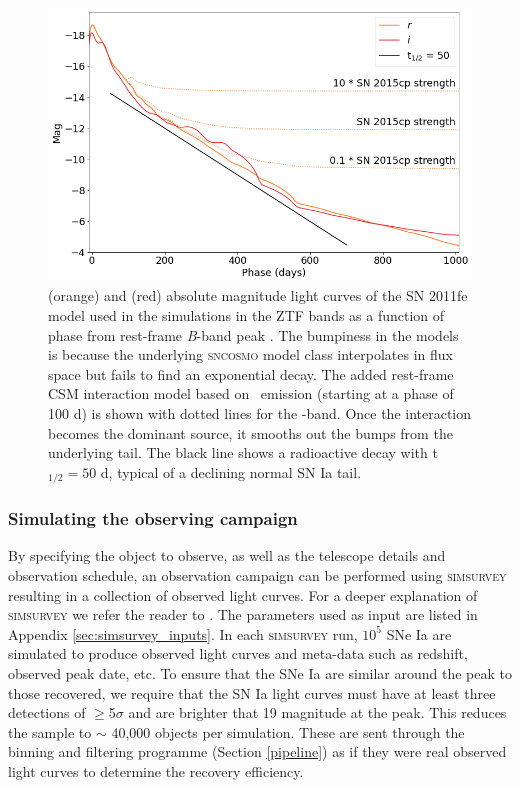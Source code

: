 \documentclass[a4paper,oneside,12pt, class=Latex/Classes/PhDthesisPSnPDF, crop=false]{standalone}
\begin{document}
\begin{figure}
 \centering
 \includegraphics[width=\textwidth]{../Images/chapter_3/11fe_mods.png}
 \caption{\ztfr (orange) and \ztfi (red) absolute magnitude light curves of the SN 2011fe model used in the simulations in the ZTF bands as a function of phase from rest-frame \textit{B}-band peak \citep{spec_HST}. The bumpiness in the models is because the underlying \textsc{sncosmo} model class interpolates in flux space but fails to find an exponential decay. The added rest-frame CSM interaction model based on \Halpha~emission (starting at a phase of 100 d) is shown with dotted lines for the \ztfr-band. Once the interaction becomes the dominant source, it smooths out the bumps from the underlying tail. The black line shows a radioactive decay with t$_{1/2}=50$ d, typical of a declining normal SN Ia tail.}
 \label{11fe_mods}
\end{figure}

\subsubsection{Simulating the observing campaign}
\label{sim_obs}
By specifying the object to observe, as well as the telescope details and observation schedule, an observation campaign can be performed using \textsc{simsurvey} resulting in a collection of observed light curves. For a deeper explanation of \textsc{simsurvey} we refer the reader to \cite{simsurvey_main}. The parameters used as input are listed in Appendix \ref{sec:simsurvey_inputs}. In each \textsc{simsurvey} run, $10^5$ SNe Ia are simulated to produce observed light curves and meta-data such as redshift, observed peak date, etc. To ensure that the SNe Ia are similar around the peak to those recovered, we require that the SN Ia light curves must have at least three detections of $\geq$5$\sigma$ and are brighter that 19 magnitude at the peak. This reduces the sample to $\sim$ 40,000 objects per simulation. These are sent through the binning and filtering programme (Section \ref{pipeline}) as if they were real observed light curves to determine the recovery efficiency. 
\end{document}
